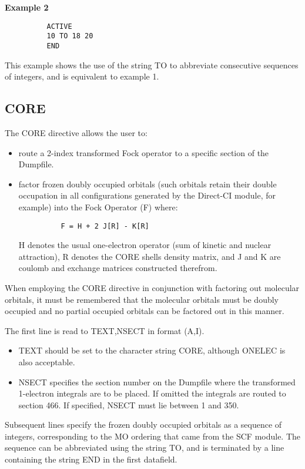\documentclass[11pt,fleqn]{article}
\begin{document}
{\bf Example 2}
{
\footnotesize
\begin{verbatim}
          ACTIVE
          10 TO 18 20
          END
\end{verbatim}
}
This example shows the use of the string TO to abbreviate consecutive
sequences of integers, and is equivalent to example 1.


\subsection[CORE]{CORE}

The CORE directive allows the user to:
\begin{itemize}
\item route a 2-index transformed Fock
operator to  a specific section of the Dumpfile. 
\item  factor frozen doubly occupied orbitals (such orbitals retain 
their double occupation
in all configurations generated by the Direct-CI module, for
example) into the Fock Operator (F) where:

{
\footnotesize
\begin{verbatim}
          F = H + 2 J[R] - K[R]
\end{verbatim}
}
H denotes the usual one-electron operator (sum of
kinetic and nuclear attraction), R denotes the CORE shells
density matrix, and J and K are coulomb and exchange matrices
constructed therefrom.
\end{itemize}
When employing the CORE directive in conjunction with factoring out
molecular orbitals, it must be remembered that the molecular orbitals
must be doubly occupied and no partial occupied orbitals can be factored
out in this manner.

The first line is read to TEXT,NSECT in format (A,I).
\begin{itemize}
\item TEXT should be set to the character string 
CORE, although ONELEC is also acceptable.
\item NSECT specifies the section number on the
Dumpfile where the transformed 1-electron integrals
are to be placed. If omitted the integrals are routed to
section 466. If specified, NSECT must lie between 1 and 350.
\end{itemize}
Subsequent lines specify the frozen doubly occupied
orbitals as a sequence of integers, corresponding to the MO ordering
that came from the SCF module.  The sequence can be abbreviated
using the string TO, and
is terminated by a line containing the string END in the first
datafield.\\
\end{document}
